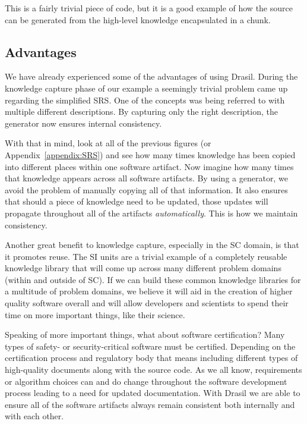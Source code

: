 \documentclass[preprint, 10pt]{sigplanconf}
\begin{document}
This is a fairly trivial piece of code, but it is a good example of how the
source can be generated from the high-level knowledge encapsulated in a chunk.

\subsection{Advantages}
\label{subsec:advantages}

We have already experienced some of the advantages of using
Drasil. During the knowledge capture phase of our example a seemingly trivial
problem came up regarding the simplified SRS. One of the concepts was being
referred to with multiple different descriptions. By capturing only the right
description, the generator now ensures internal consistency. %

With that in mind, look at all of the previous figures (or
Appendix~\ref{appendix:SRS}) and see how many times knowledge has been copied into
different places within one software artifact. Now imagine how many times that
knowledge appears across all software artifacts. By using a generator, we avoid
the problem of manually copying all of that information. It also ensures
that should a piece of knowledge need to be updated, those updates will
propagate throughout all of the artifacts \emph{automatically}.  This is how we
maintain consistency.
	
Another great benefit to knowledge capture, especially in the SC domain, is that
it promotes reuse. The SI units are a trivial example of a completely reusable
knowledge library that will come up across many different problem domains
(within and outside of SC). If we can build these common knowledge libraries for
a multitude of problem domains, we believe it will aid in the creation of higher
quality software overall and will allow developers and scientists to spend their
time on more important things, like their science.

Speaking of more important things, what about software certification? Many types
of safety- or security-critical software must be certified. Depending on the
certification process and regulatory body that means including different types
of high-quality documents along with the source code. As we all know,
requirements or algorithm choices can and do change throughout the software
development process leading to a need for updated documentation. With Drasil we
are able to ensure all of the software artifacts always remain consistent both
internally and with each other. %
\end{document}
